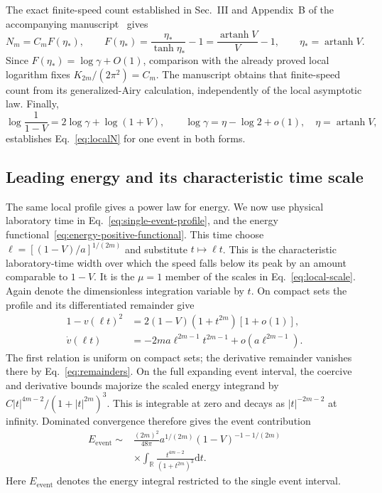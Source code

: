 \documentclass[11pt]{article}
\newcommand{\dd}{\mathrm d}
\newcommand{\R}{\mathbb R}
\newcommand{\atanh}{\operatorname{artanh}}
\begin{document}
The exact finite-speed count established in Sec.~III and Appendix~B
of the accompanying manuscript~\cite{MirrorCountsManuscript} gives
\begin{equation}
 N_m=C_mF(\eta_*),\qquad
 F(\eta_*)=\frac{\eta_*}{\tanh\eta_*}-1
          =\frac{\atanh V}{V}-1,\qquad \eta_*=\atanh V.
 \label{eq:F}
\end{equation}
Since $F(\eta_*)=\log\gamma+O(1)$, comparison with the already
proved local logarithm fixes $K_{2m}/(2\pi^2)=C_m$.
The manuscript obtains that finite-speed count from its generalized-Airy
calculation, independently of the local asymptotic law. Finally,
\begin{equation}
 \log\frac1{1-V}=2\log\gamma+\log(1+V),\qquad
 \log\gamma=\eta-\log2+o(1),\quad \eta=\atanh V,
 \label{eq:local-log-gamma}
\end{equation}
establishes Eq.~\eqref{eq:localN} for one event in both forms.

\subsection{Leading energy and its characteristic time scale}

The same local profile gives a power law for energy. We now use
physical laboratory time in Eq.~\eqref{eq:single-event-profile},
and the energy functional~\eqref{eq:energy-positive-functional}.
This time choose
$\ell=[(1-V)/a]^{1/(2m)}$ and substitute $t\mapsto\ell t$.
This is the characteristic laboratory-time width over which the
speed falls below its peak by an amount comparable to $1-V$.
It is the $\mu=1$ member of the scales in Eq.~\eqref{eq:local-scale}.
Again denote the dimensionless integration variable by $t$.
On compact sets the profile and its differentiated remainder give
\begin{align}
 1-v(\ell t)^2
    &=2(1-V)(1+t^{2m})[1+o(1)],\nonumber\\
 \dot v(\ell t)
    &=-2m a\ell^{2m-1}t^{2m-1}
                          +o(a\ell^{2m-1}).
 \label{eq:energy-scaled-profile}
\end{align}
The first relation is uniform on compact sets; the derivative
remainder vanishes there by Eq.~\eqref{eq:remainders}.
On the full expanding event interval, the coercive and derivative
bounds majorize the scaled energy integrand by
$C|t|^{4m-2}/(1+|t|^{2m})^3$.
This is integrable at zero and decays as $|t|^{-2m-2}$ at infinity.
Dominated convergence therefore gives the event contribution
\begin{align}
 E_{\mathrm{event}}\sim{}&\frac{(2m)^2}{48\pi}
        a^{1/(2m)}(1-V)^{-1-1/(2m)}\nonumber\\
 &\times\int_\R\frac{t^{4m-2}}{(1+t^{2m})^3}\dd t.
 \label{eq:betaenergy}
\end{align}
Here $E_{\mathrm{event}}$ denotes the energy integral restricted to
the single event interval.
\end{document}
